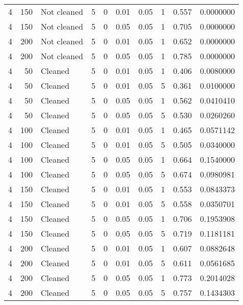 \begin{table}
{{\begin{tabular}{rrlrrrrrrr}
\hspace{1em}4 & 150 & Not cleaned & 5 & 0 & 0.01 & 0.05 & 1 & 0.557 & 0.0000000\\
\hspace{1em}4 & 150 & Not cleaned & 5 & 0 & 0.05 & 0.05 & 1 & 0.705 & 0.0000000\\
\hspace{1em}4 & 200 & Not cleaned & 5 & 0 & 0.01 & 0.05 & 1 & 0.652 & 0.0000000\\
\hspace{1em}4 & 200 & Not cleaned & 5 & 0 & 0.05 & 0.05 & 1 & 0.785 & 0.0000000\\
\hspace{1em}4 & 50 & Cleaned & 5 & 0 & 0.01 & 0.05 & 1 & 0.406 & 0.0080000\\
\hspace{1em}4 & 50 & Cleaned & 5 & 0 & 0.01 & 0.05 & 5 & 0.361 & 0.0100000\\
\hspace{1em}4 & 50 & Cleaned & 5 & 0 & 0.05 & 0.05 & 1 & 0.562 & 0.0410410\\
\hspace{1em}4 & 50 & Cleaned & 5 & 0 & 0.05 & 0.05 & 5 & 0.530 & 0.0260260\\
\hspace{1em}4 & 100 & Cleaned & 5 & 0 & 0.01 & 0.05 & 1 & 0.465 & 0.0571142\\
\hspace{1em}4 & 100 & Cleaned & 5 & 0 & 0.01 & 0.05 & 5 & 0.505 & 0.0340000\\
\hspace{1em}4 & 100 & Cleaned & 5 & 0 & 0.05 & 0.05 & 1 & 0.664 & 0.1540000\\
\hspace{1em}4 & 100 & Cleaned & 5 & 0 & 0.05 & 0.05 & 5 & 0.674 & 0.0980981\\
\hspace{1em}4 & 150 & Cleaned & 5 & 0 & 0.01 & 0.05 & 1 & 0.553 & 0.0843373\\
\hspace{1em}4 & 150 & Cleaned & 5 & 0 & 0.01 & 0.05 & 5 & 0.558 & 0.0350701\\
\hspace{1em}4 & 150 & Cleaned & 5 & 0 & 0.05 & 0.05 & 1 & 0.706 & 0.1953908\\
\hspace{1em}4 & 150 & Cleaned & 5 & 0 & 0.05 & 0.05 & 5 & 0.719 & 0.1181181\\
\hspace{1em}4 & 200 & Cleaned & 5 & 0 & 0.01 & 0.05 & 1 & 0.607 & 0.0882648\\
\hspace{1em}4 & 200 & Cleaned & 5 & 0 & 0.01 & 0.05 & 5 & 0.611 & 0.0561685\\
\hspace{1em}4 & 200 & Cleaned & 5 & 0 & 0.05 & 0.05 & 1 & 0.773 & 0.2014028\\
\hspace{1em}4 & 200 & Cleaned & 5 & 0 & 0.05 & 0.05 & 5 & 0.757 & 0.1434303\\
\bottomrule
\end{tabular}
}}
 \end{table}
